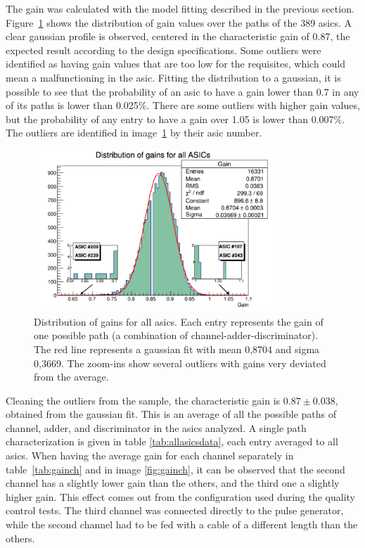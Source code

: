 \documentclass[main.tex]{subfiles}
\begin{document}
The gain was calculated with the model fitting described in the previous section. Figure~\ref{fig:gaindist} shows the distribution of gain values over the paths of the 389 \glspl{asic}. A clear gaussian profile is observed, centered in the characteristic gain of 0.87, the expected result according to the design specifications. Some outliers were identified as having gain values that are too low for the requisites, which could mean a malfunctioning in the \gls{asic}. Fitting the distribution to a gaussian, it is possible to see that the probability of an \gls{asic} to have a gain lower than 0.7 in any of its paths is lower than 0.025\%. There are some outliers with higher gain values, but the probability of any entry to have a gain over 1.05 is lower than 0.007\%. The outliers are identified in image~\ref{fig:gaindist} by their \gls{asic} number.
\begin{figure}[h]
  \centering
  \includegraphics[width=0.8\textwidth]{./Pictures/gaindistribution.pdf}
  \caption{Distribution of gains for all \glspl{asic}. Each entry represents the gain of one possible path (a combination of channel-adder-discriminator). The red line represents a gaussian fit with mean 0,8704 and sigma 0,3669.
    The zoom-ins show several outliers with gains very deviated from the average.}
  \label{fig:gaindist}
\end{figure}

Cleaning the outliers from the sample, the characteristic gain is $0.87 \pm 0.038$, obtained from the gaussian fit. This is an average of all the possible paths of channel, adder, and discriminator in the \glspl{asic} analyzed. A single path characterization is given in table \ref{tab:allasicsdata}, each entry averaged to all \glspl{asic}.
When having the average gain for each channel separately in table~\ref{tab:gainch} and in image \ref{fig:gainch}, it can be observed that the second channel has a slightly lower gain than the others, and the third one a slightly higher gain. This effect comes out from the configuration used during the quality control tests. The third channel was connected directly to the pulse generator, while the second channel had to be fed with a cable of a different length than the others.
\end{document}
